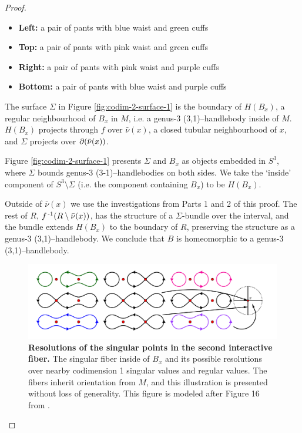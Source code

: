 \begin{proof}


	{\renewcommand\labelitemi{}
	\begin{itemize}
		\item \textbf{Left:} a pair of pants with blue waist and green cuffs
		\item \textbf{Top:} a pair of pants with pink waist and green cuffs
		\item \textbf{Right:} a pair of pants with pink waist and purple cuffs
		\item \textbf{Bottom:} a pair of pants with blue waist and purple cuffs
	\end{itemize}
	}

	
	The surface $\Sigma$ in Figure \ref{fig:codim-2-surface-1} is the boundary of $H(B_x)$, a regular neighbourhood of $B_x$ in $M$, i.e. a genus-3 (3,1)--handlebody inside of $M$.
	$H(B_x)$ projects through $f$ over $\bar\nu(x)$, a closed tubular neighbourhood of $x$, and $\Sigma$ projects over $\partial(\bar\nu(x))$.
	
	Figure \ref{fig:codim-2-surface-1} presents $\Sigma$ and $B_x$ as objects embedded in $S^3$, where $\Sigma$ bounds genus-3 (3-1)--handlebodies on both sides.
	We take the `inside' component of $S^3\setminus\Sigma$ (i.e. the component containing $B_x$) to be $H(B_x)$.
	
	Outside of $\bar\nu(x)$ we use the investigations from Parts 1 and 2 of this proof. The rest of $R$, $f^{\,\text{-}1}(R\setminus\bar\nu(x))$, has the structure of a $\Sigma$-bundle over the interval, and the bundle extends $H(B_x)$ to the boundary of $R$, preserving the structure as a genus-3 (3,1)--handlebody.
	We conclude that $B$ is homeomorphic to a genus-3 (3,1)--handlebody.
	
		\begin{figure}[h!]
		\centering
		\includegraphics[width=\textwidth]{figures/codim-2-interactive-fiber-2.png}
		\caption{
			\textbf{Resolutions of the singular points in the second interactive fiber.}
			The singular fiber inside of $B_x$ and its possible resolutions over nearby codimension 1 singular values and regular values.
			The fibers inherit orientation from $M$, and this illustration is presented without loss of generality.
			This figure is modeled after Figure 16 from \cite{CostThur08}.
		}
		\label{fig:codim-2-interactive-fiber-2}
	\end{figure}
	

\end{proof}
